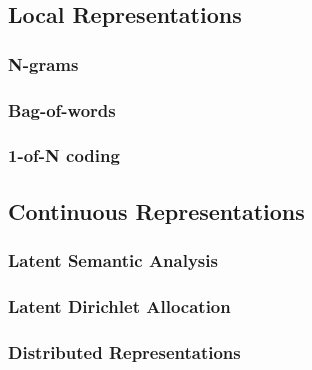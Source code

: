 \subsection{Local Representations}
\label{sec:rel_local_representation}

\subsubsection{N-grams}
\label{sec:sub_ngrams}

\subsubsection{Bag-of-words}
\label{sec:rel_bow}

\subsubsection{1-of-N coding}
\label{sec:1_of_coding}

\subsection{Continuous Representations}
\label{sec:sub_continuous_representation}

\subsubsection{Latent Semantic Analysis}
\label{sec:rel_local_representation}

\subsubsection{Latent Dirichlet Allocation}
\label{sec:rel_lda}

\subsubsection{Distributed Representations}
\label{sec:dis_rep}





